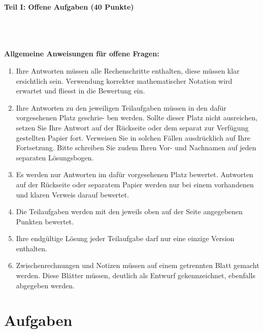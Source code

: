 

\begin{Large}
\textbf{Teil I: Offene Aufgaben (40 Punkte)}
\end{Large}
\\
\\
\\
\textbf{Allgemeine Anweisungen für offene Fragen:}
\\
\renewcommand{\labelenumi}{(\roman{enumi})}
\begin{enumerate}
\item
Ihre Antworten müssen alle Rechenschritte enthalten,
diese müssen klar ersichtlich sein.
Verwendung korrekter mathematischer Notation wird erwartet
und fliesst in die Bewertung ein.

\item
Ihre Antworten zu den jeweiligen Teilaufgaben müssen in den dafür vorgesehenen Platz geschrie-
ben werden. Sollte dieser Platz nicht ausreichen, setzen Sie Ihre Antwort auf der Rückseite oder
dem separat zur Verfügung gestellten Papier fort. Verweisen Sie in solchen Fällen ausdrücklich
auf Ihre Fortsetzung. Bitte schreiben Sie zudem Ihren Vor- und Nachnamen auf jeden separaten
Lösungsbogen.

\item
Es werden nur Antworten im dafür vorgesehenen Platz bewertet. Antworten auf der Rückseite
oder separatem Papier werden nur bei einem vorhandenen und klaren Verweis darauf bewertet.

\item
Die Teilaufgaben werden mit den jeweils oben auf der Seite angegebenen Punkten bewertet.

\item
Ihre endgültige Lösung jeder Teilaufgabe darf nur eine einzige Version enthalten.

\item
Zwischenrechnungen und Notizen müssen auf einem getrennten Blatt gemacht werden. Diese
Blätter müssen, deutlich als Entwurf gekennzeichnet, ebenfalls abgegeben werden.
\end{enumerate}

\newpage
\section*{\hfil Aufgaben \hfil}
\vspace{1cm}
